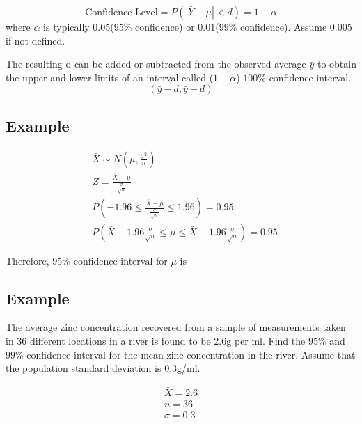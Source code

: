 \documentclass{article}
\begin{document}
    \begin{equation*}
        \text{Confidence Level} = P(|\bar{Y} - \mu| < d) = 1 - \alpha
    \end{equation*}
    where $\alpha$ is typically 0.05(95$\%$ confidence) or 0.01($99\%$ confidence). Assume 0.005 if not defined. \par

    The resulting d can be added or subtracted from the observed average $\bar{y}$ to obtain 
    the upper and lower limits of an interval called ($1-\alpha$) $100\%$ confidence interval.
    \begin{equation*}
        (\bar{y} - d, \bar{y} + d)
    \end{equation*}

    \subsection*{Example}
    \begin{align*}
        &\bar{X} \sim N(\mu, \frac{\sigma^{2}}{n})\\
        &Z = \frac{\bar{X} - \mu}{\frac{\sigma}{\sqrt{n}}}\\
        &P(-1.96 \leq \frac{\bar{X} - \mu}{\frac{\sigma}{\sqrt{n}}} \leq 1.96) = 0.95\\
        &P(\bar{X} - 1.96\frac{\sigma}{\sqrt{n}} \leq \mu \leq \bar{X} + 1.96\frac{\sigma}{\sqrt{n}}) = 0.95
    \end{align*}

    Therefore, 95$\%$ confidence interval for $\mu$ is 
    \begin{equation*}
        [\bar{X} - Z_{0.025}\frac{\sigma}{\sqrt{n}}, \bar{X} + Z_{0.025}\frac{\sigma}{\sqrt{n}}]
    \end{equation*}
    
    \subsection*{Example}
    The average zinc concentration recovered from a sample of measurements taken in 
    36 different locations in a river is found to be 2.6g per ml. Find the $95\%$ and $99\%$ confidence interval for 
    the mean zinc concentration in the river. Assume that the population standard deviation is 0.3g/ml.

    \begin{align*}
        \bar{X} = 2.6\\
        n = 36\\
        \sigma = 0.3
    \end{align*}
\end{document}
